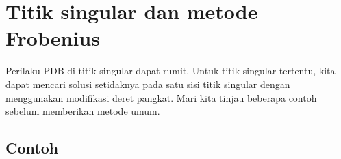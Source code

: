 
\sectionnewpage
\section{Titik singular dan metode Frobenius}
\label{frobenius:section}



Perilaku PDB di titik singular dapat rumit.
Untuk titik singular tertentu,
kita dapat mencari solusi setidaknya pada satu sisi titik singular
dengan menggunakan modifikasi
deret pangkat.
Mari kita tinjau beberapa contoh sebelum memberikan metode umum.

\subsection{Contoh}

